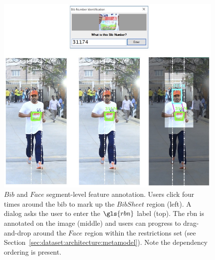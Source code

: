 \begin{figure}
  \centering
  \includegraphics[width=\textwidth]{images/dataset/argus/argus_entry}
  \caption[Bib and Face feature annotation with Argus]{$Bib$ and $Face$ segment-level feature annotation. Users click four times around the bib to mark up the $BibSheet$ region (left). A dialog asks the user to enter the $\gls{rbn}$ label (top). The \gls{rbn} is annotated on the image (middle) and users can progress to drag-and-drop around the $Face$ region within the restrictions set (see Section~\ref{sec:dataset:architecture:metamodel}). Note the dependency ordering is present.}
  \label{fig:dataset:argus:bib_and_face}
\end{figure}

